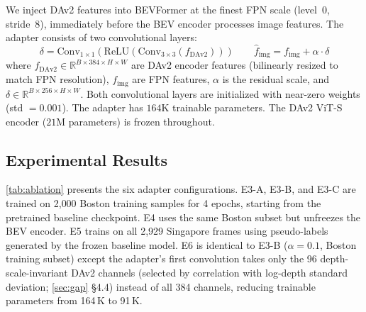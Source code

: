\documentclass[letterpaper, 10pt, journal]{IEEEtran}
\begin{document}
We inject DAv2 features into BEVFormer at the finest FPN scale (level~0, stride~8),
immediately before the BEV encoder processes image features.
The adapter consists of two convolutional layers:
\begin{equation}
  \delta = \text{Conv}_{1\times1}(\text{ReLU}(\text{Conv}_{3\times3}(f_\text{DAv2})))
  \qquad
  \hat{f}_\text{img} = f_\text{img} + \alpha \cdot \delta
\end{equation}
where $f_\text{DAv2} \in \mathbb{R}^{B \times 384 \times H \times W}$ are DAv2 encoder
features (bilinearly resized to match FPN resolution), $f_\text{img}$ are FPN features,
$\alpha$ is the residual scale, and $\delta \in \mathbb{R}^{B \times 256 \times H \times W}$.
Both convolutional layers are initialized with near-zero weights (std $= 0.001$).
The adapter has $164$K trainable parameters.
The DAv2 ViT-S encoder ($21$M parameters) is frozen throughout.

\subsection{Experimental Results}

\cref{tab:ablation} presents the six adapter configurations.
E3-A, E3-B, and E3-C are trained on 2{,}000 Boston training samples for 4 epochs,
starting from the pretrained baseline checkpoint.
E4 uses the same Boston subset but unfreezes the BEV encoder.
E5 trains on all 2{,}929 Singapore frames using pseudo-labels generated by the frozen
baseline model.
E6 is identical to E3-B ($\alpha = 0.1$, Boston training subset) except the adapter's
first convolution takes only the 96 depth-scale-invariant DAv2 channels
(selected by correlation with log-depth standard deviation; \cref{sec:gap} §4.4)
instead of all 384 channels, reducing trainable parameters from 164\,K to 91\,K.
\end{document}
